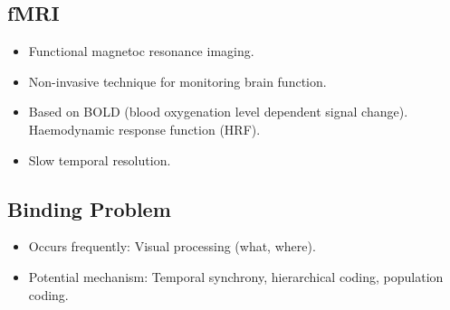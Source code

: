 \documentclass[a4paper, 12pt]{article}
\begin{document}
\subsection{fMRI}
\begin{itemize}[noitemsep,nolistsep]
	\item Functional magnetoc resonance imaging.
	\item Non-invasive technique for monitoring brain function.
	\item Based on BOLD (blood oxygenation level dependent signal change). Haemodynamic response function (HRF).
	\item Slow temporal resolution.
\end{itemize}

\subsection{Binding Problem}
\begin{itemize}[noitemsep,nolistsep]
	\item Occurs frequently: Visual processing (what, where).
	\item Potential mechanism: Temporal synchrony, hierarchical coding, population coding.
\end{itemize}
\end{document}
